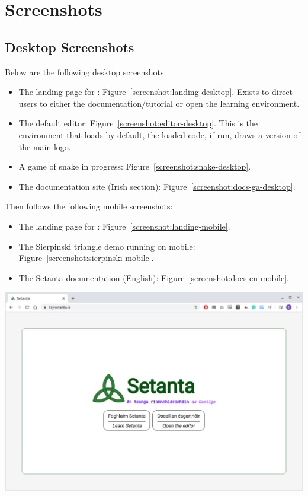 \chapter{\trys{} Screenshots}
\label{appendix:screenshots}

\section{Desktop Screenshots}

Below are the following desktop screenshots:
\begin{itemize}
    \item The landing page for \trys{}: Figure~\ref{screenshot:landing-desktop}. Exists to direct users to either the documentation/tutorial or open the learning environment.
    \item The default editor: Figure~\ref{screenshot:editor-desktop}. This is the environment that loads by default, the loaded code, if run, draws a version of the main logo.
    \item A game of snake in progress: Figure~\ref{screenshot:snake-desktop}.
    \item The documentation site (Irish section): Figure~\ref{screenshot:docs-ga-desktop}.
\end{itemize}
Then follows the following mobile screenshots:
\begin{itemize}
    \item The landing page for \trys{}: Figure~\ref{screenshot:landing-mobile}.
    \item The Sierpinski triangle demo running on mobile: Figure~\ref{screenshot:sierpinski-mobile}.
    \item The Setanta documentation (English): Figure~\ref{screenshot:docs-en-mobile}.
\end{itemize}

\begin{center}
    \includegraphics[scale=0.36]{app4assets/landing-desktop}
    \label{screenshot:landing-desktop}
\end{center}

